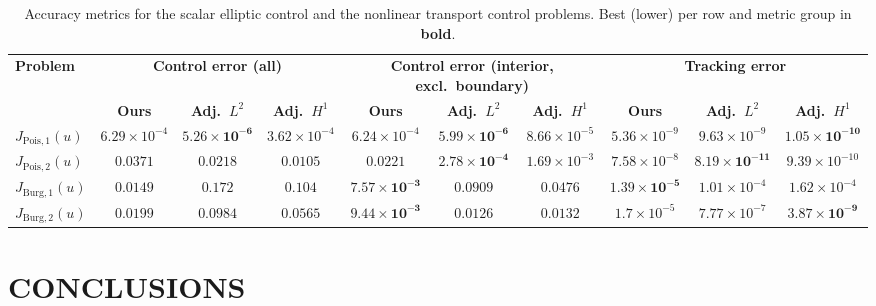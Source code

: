\documentclass[final,1p,times]{elsarticle}
\theoremstyle{plain} %
\theoremstyle{definition} %
\theoremstyle{remark} %
\begin{document}
\begin{table}[t]
\centering
\caption{Accuracy metrics for the scalar elliptic control and the nonlinear transport control problems. Best (lower) per row and metric group in \textbf{bold}.}
\label{tab:accuracy_metrics_pois_burg}
\scriptsize
\setlength{\tabcolsep}{2pt}
\begin{tabular}{lccccccccc}
\toprule
\textbf{Problem} & \multicolumn{3}{c}{\textbf{Control error (all)}} & \multicolumn{3}{c}{\textbf{Control error (interior, excl.\ boundary)}} & \multicolumn{3}{c}{\textbf{Tracking error}} \\
\cmidrule(lr){2-4}\cmidrule(lr){5-7}\cmidrule(lr){8-10}
 & \textbf{Ours} & \textbf{Adj.\ $L^2$} & \textbf{Adj.\ $H^1$} & \textbf{Ours} & \textbf{Adj.\ $L^2$} & \textbf{Adj.\ $H^1$} & \textbf{Ours} & \textbf{Adj.\ $L^2$} & \textbf{Adj.\ $H^1$} \\
\midrule
$J_{\mathrm{Pois},1}(u)$ & $6.29\times 10^{-4}$ & $\boldsymbol{5.26\times 10^{-6}}$ & $3.62\times 10^{-4}$ & $6.24\times 10^{-4}$ & $\boldsymbol{5.99\times 10^{-6}}$ & $8.66\times 10^{-5}$ & $5.36\times 10^{-9}$ & $9.63\times 10^{-9}$ & $\boldsymbol{1.05\times 10^{-10}}$ \\
$J_{\mathrm{Pois},2}(u)$ & $0.0371$ & $0.0218$ & $\boldsymbol{0.0105}$ & $0.0221$ & $\boldsymbol{2.78\times 10^{-4}}$ & $1.69\times 10^{-3}$ & $7.58\times 10^{-8}$ & $\boldsymbol{8.19\times 10^{-11}}$ & $9.39\times 10^{-10}$ \\
$J_{\mathrm{Burg},1}(u)$ & $\boldsymbol{0.0149}$ & $0.172$ & $0.104$ & $\boldsymbol{7.57\times 10^{-3}}$ & $0.0909$ & $0.0476$ & $\boldsymbol{1.39\times 10^{-5}}$ & $1.01\times 10^{-4}$ & $1.62\times 10^{-4}$ \\
$J_{\mathrm{Burg},2}(u)$ & $\boldsymbol{0.0199}$ & $0.0984$ & $0.0565$ & $\boldsymbol{9.44\times 10^{-3}}$ & $0.0126$ & $0.0132$ & $1.7\times 10^{-5}$ & $7.77\times 10^{-7}$ & $\boldsymbol{3.87\times 10^{-9}}$ \\
\bottomrule
\end{tabular}
\end{table}


\section{CONCLUSIONS}\label{section_6}
\end{document}
